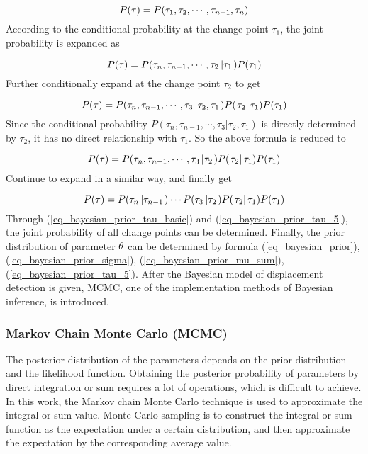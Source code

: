 \documentclass[final,3p,times]{elsarticle}
\begin{document}
	\begin{equation}\label{eq_bayesian_prior_tau_1}
	P({\bf{\tau }}) = P({\tau _1},{\tau _2}, \cdots ,{\tau _{n - 1}},{\tau _n})
	\end{equation}
	According to the conditional probability at the change point ${\tau _1}$, the joint probability is expanded as
	
	\begin{equation}\label{eq_bayesian_prior_tau_2}
	P({\bf{\tau }}) = P({\tau _n},{\tau _{n - 1}}, \cdots ,{\tau _2}\left| {{\tau _1}} \right.)P({\tau _1})
	\end{equation}
	Further conditionally expand at the change point ${\tau _2}$ to get
	
	\begin{equation}\label{eq_bayesian_prior_tau_3}
	P({\bf{\tau }}) = P({\tau _n},{\tau _{n - 1}}, \cdots ,{\tau _3}\left| {{\tau _2},{\tau _1}} \right.)P(\left. {{\tau _2}} \right|{\tau _1})P({\tau _1})
	\end{equation}
	Since the conditional probability $P({\tau _n},{\tau _{n - 1}}, \cdots ,{\tau _3}\left| {{\tau _2},{\tau _1}} \right.)$ is directly determined by ${\tau _2}$, it has no direct relationship with ${\tau _1}$. So the above formula is reduced to
	
	\begin{equation}\label{eq_bayesian_prior_tau_4}
	P({\bf{\tau }}) = P({\tau _n},{\tau _{n - 1}}, \cdots ,{\tau _3}\left| {{\tau _2}} \right.)P(\left. {{\tau _2}} \right|{\tau _1})P({\tau _1})
	\end{equation}
	Continue to expand in a similar way, and finally get
	
	\begin{equation}\label{eq_bayesian_prior_tau_5}
	P({\bf{\tau }}) = P({\tau _n}\left| {{\tau _{n - 1}}} \right.) \cdots P({\tau _3}\left| {{\tau _2}} \right.)P(\left. {{\tau _2}} \right|{\tau _1})P({\tau _1})
	\end{equation}
	Through (\ref{eq_bayesian_prior_tau_basic}) and (\ref{eq_bayesian_prior_tau_5}), the joint probability of all change points can be determined. Finally, the prior distribution of parameter ${\bf{\theta }}$ can be determined by formula (\ref{eq_bayesian_prior}), (\ref{eq_bayesian_prior_sigma}), (\ref{eq_bayesian_prior_mu_sum}), (\ref{eq_bayesian_prior_tau_5}).  After the Bayesian model of displacement detection is given, MCMC, one of the implementation methods of Bayesian inference, is introduced.
	
	\subsubsection{Markov Chain Monte Carlo (MCMC)}
	The posterior distribution of the parameters depends on the prior distribution and the likelihood function. Obtaining the posterior probability of parameters by direct integration or sum requires a lot of operations, which is difficult to achieve\cite{robert2013monte}. In this work, the Markov chain Monte Carlo technique is used to approximate the integral or sum value. Monte Carlo sampling is to construct the integral or sum function as the expectation under a certain distribution, and then approximate the expectation by the corresponding average value\cite{goodfellow2016deep}.
	
\end{document}
